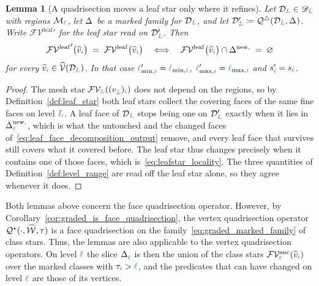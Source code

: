 \documentclass[a4paper, 12pt]{article}
\makeatletter
\newcommand{\quadriF}{\mathcal{Q}^{\triangle}}                   %
\newcommand{\quadriV}{\mathcal{Q}^{\star}}                       %
\newcommand{\quadriVup}[1]{\quadriV_{\rightarrow #1}}            %
\newcommand{\lminIdx}[1]{\l_{\min,#1}}
\newcommand{\lmaxIdx}[1]{\l_{\max,#1}}
\newcommand{\levelSpan}[1]{s_{#1}}
\newcommand{\targetlevel}{\tau}                                 %
\newcommand{\green}{\color{ForestGreen}}
\newcommand{\brickred}{\color{BrickRed}}
\newcommand{\V}{\mathcal{V}}
\newcommand{\F}{\mathcal{F}}
\DeclareRobustCommand{\simplexsubsetTwo}[2][]{\Delta\ifx\@empty#1\@empty\else^{#1}\fi_{#2}}
\DeclareRobustCommand{\simplexsubsetNew}[2][]{\Delta^{\mathrm{new}\ifx\@empty#1\@empty\else,#1\fi}_{#2}}
\DeclareRobustCommand{\simplexsubsetNewAll}[1][]{\Delta^{\mathrm{new}\ifx\@empty#1\@empty\else,#1\fi}}
\newcommand{\vertex}[2]{\freeQ{v}{}{#1}{#2}}
\newcommand{\vertexClass}[1]{\widehat{v}_{#1}}
\newcommand{\vertexClasses}{\widehat{\V}}
\DeclareRobustCommand{\markedVertexClasses}[1][]{\widehat{\mathcal{W}}\ifx\@empty#1\@empty\else^{#1}\fi}
\newcommand{\FVl}[1]{\F\V_{#1}}
\newcommand{\coarseIdxone}{{\brickred i}}
\renewcommand{\l}{{\green\ell}}
\renewcommand{\L}{{\green L}}
\newcommand{\freeQ}[4]{ ( {#1}^{#2}_{#3} )_{#4}}
\newcommand{\M}{\mathcal{M}}
\newtheorem{lemma}[theorem]{Lemma}
\theoremstyle{definition}
\theoremstyle{plain}
\numberwithin{equation}{section}
\newcommand{\tobecut}[1]{{\color{red} #1}}     %
\DeclareRobustCommand{\domseq}[1][]{\mathcal{D}\ifx\@empty#1\@empty\else_{#1}\fi}
\newcommand{\alldomseqs}{\mathscr{D}}
\newcommand{\FVleaf}[1]{\F\V^{\mathrm{leaf}}_{#1}}          %
\newcommand{\FVanc}[1]{\F\V^{\mathrm{anc}}_{#1}}            %
\makeatother
\begin{document}
\begin{lemma}[A quadrisection moves a leaf star only where it refines]
    \label{lemma:leafstar_locality}
    Let $\domseq[\L] \in \alldomseqs_\L$ with regions $\M_\l$, let $\simplexsubsetTwo{}$ be a marked family for $\domseq[\L]$, and let $\domseq[\L]' \coloneq \quadriF(\domseq[\L], \simplexsubsetTwo{})$. Write ${\FVleaf{}}'$ for the leaf star read on $\domseq[\L]'$. Then
    \begin{equation}
        \label{eq:leafstar_locality}
        {\FVleaf{}}' \big( \vertexClass{\coarseIdxone} \big) \; = \; \FVleaf{} \big( \vertexClass{\coarseIdxone} \big)
        \quad \Longleftrightarrow \quad
        \FVleaf{} \big( \vertexClass{\coarseIdxone} \big) \cap \simplexsubsetNewAll{} \; = \; \varnothing
    \end{equation}
    for every $\vertexClass{\coarseIdxone} \in \vertexClasses(\domseq[\L])$. In that case $\lminIdx{\coarseIdxone}' = \lminIdx{\coarseIdxone}$, $\lmaxIdx{\coarseIdxone}' = \lmaxIdx{\coarseIdxone}$ and $\levelSpan{\coarseIdxone}' = \levelSpan{\coarseIdxone}$.
\end{lemma}
\begin{proof}
    The mesh star $\FVl{\L}(\vertex{\L}{\coarseIdxone})$ does not depend on the regions, so by Definition~\ref{def:leaf_star} both leaf stars collect the covering faces of the same fine faces on level $\L$. A leaf face of $\domseq[\L]$ stops being one on $\domseq[\L]'$ exactly when it lies in $\simplexsubsetNew{\l}$, which is what the untouched and the changed faces of~\eqref{eq:leaf_face_decomposition_output} remove, and every leaf face that survives still covers what it covered before. The leaf star thus changes precisely when it contains one of those faces, which is~\eqref{eq:leafstar_locality}. The three quantities of Definition~\ref{def:level_range} are read off the leaf star alone, so they agree whenever it does.
\end{proof}

Both lemmas above concern the face quadrisection operator. However, by Corollary~\ref{cor:graded_is_face_quadrisection}, the vertex quadrisection operator $\quadriV(\cdot, \markedVertexClasses, \targetlevel)$ is a face quadrisection on the family~\eqref{eq:graded_marked_family} of class stars. Thus, the lemmas are also applicable to the vertex quadrisection operators. On level $\l$ the slice $\simplexsubsetTwo{\l}$ is then the union of the class stars $\FVanc{\l}(\vertexClass{\coarseIdxone})$ over the marked classes with $\targetlevel_\coarseIdxone > \l$, and the predicates that can have changed on level $\l$ are those of its vertices.
\end{document}
